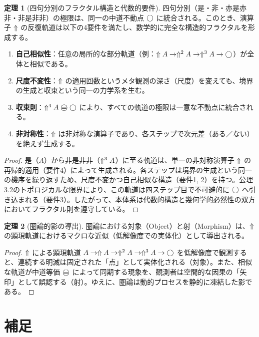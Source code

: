 \documentclass[11pt,a4paper]{article}
\theoremstyle{definition}
\newtheorem{theorem}{定理}[section]
\begin{document}
\begin{theorem}[四句分別のフラクタル構造と代数的要件]
四句分別（是・非・亦是亦非・非是非非）の極限は、同一の中道不動点 $\bigcirc$ に統合される。このとき、演算子 $\Uparrow$ の反復軌道は以下の4要件を満たし、数学的に完全な構造的フラクタルを形成する。
\begin{enumerate}
    \item \textbf{自己相似性}：任意の局所的な部分軌道（例：$\Uparrow A \to \Uparrow^2 A \to \Uparrow^3 A \to \bigcirc$）が全体と相似である。
    \item \textbf{尺度不変性}：$\Uparrow$ の適用回数というメタ観測の深さ（尺度）を変えても、境界の生成と収束という同一の力学系を生む。
    \item \textbf{収束則}：$\metanegation^4 A \mweq \dfix$ により、すべての軌道の極限は一意な不動点に統合される。
    \item \textbf{非対称性}：$\Uparrow$ は非対称な演算子であり、各ステップで次元差（ある／ない）を絶えず生成する。
\end{enumerate}
\end{theorem}

\begin{proof}
是（$A$）から非是非非（$\Uparrow^3 A$）に至る軌道は、単一の非対称演算子 $\Uparrow$ の再帰的適用（要件4）によって生成される。各ステップは境界の生成という同一の機序を繰り返すため、尺度不変かつ自己相似な構造（要件1, 2）を持つ。公理3.2のトポロジカルな限界により、この軌道は四ステップ目で不可避的に $\bigcirc$ へ引き込まれる（要件3）。したがって、本体系は代数的構造と幾何学的必然性の双方においてフラクタル則を遵守している。
\end{proof}

\begin{theorem}[圏論的影の導出]
圏論における対象（Object）と射（Morphism）は、$\Uparrow$ の顕現軌道におけるマクロな近似（低解像度での実体化）として導出される。
\end{theorem}

\begin{proof}
$\Uparrow$ による顕現軌道 $A \to \Uparrow A \to \Uparrow^2 A \to \Uparrow^3 A \to \bigcirc$ を低解像度で観測すると、連続する明滅は固定された「点」として実体化される（対象）。また、相似な軌道が中道等価 $\mweq$ によって同期する現象を、観測者は空間的な因果の「矢印」として誤認する（射）。ゆえに、圏論は動的プロセスを静的に凍結した影である。
\end{proof}

\section{補足}
\end{document}
